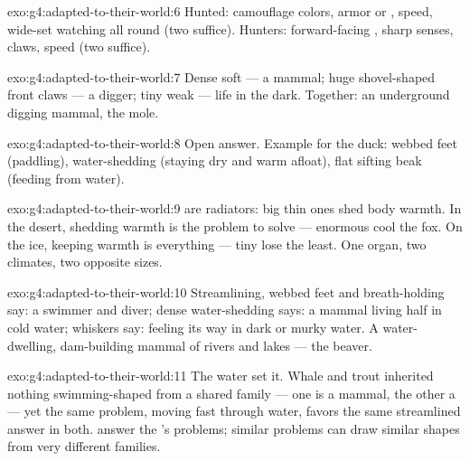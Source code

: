 \begin{solution}{exo:g4:adapted-to-their-world:6}
Hunted: camouflage colors, armor or , speed, wide-set
 watching all round (two suffice). Hunters: forward-facing
, sharp senses, claws, speed (two suffice).
\end{solution}

\begin{solution}{exo:g4:adapted-to-their-world:7}
Dense soft  --- a mammal; huge shovel-shaped front claws
--- a digger; tiny weak  --- life in the dark. Together:
an underground digging mammal, the mole.
\end{solution}

\begin{solution}{exo:g4:adapted-to-their-world:8}
Open answer. Example for the duck: webbed feet (paddling),
water-shedding  (staying dry and warm afloat), flat
sifting beak (feeding from water).
\end{solution}

\begin{solution}{exo:g4:adapted-to-their-world:9}
 are radiators: big thin ones shed body warmth. In the
desert, shedding warmth is the problem to solve --- enormous
 cool the fox. On the ice, keeping warmth is everything
--- tiny  lose the least. One organ, two climates, two
opposite sizes.
\end{solution}

\begin{solution}{exo:g4:adapted-to-their-world:10}
Streamlining, webbed feet and breath-holding say: a swimmer
and diver; dense water-shedding  says: a mammal living
half in cold water; whiskers say: feeling its way in dark or
murky water. A water-dwelling, dam-building mammal of rivers
and lakes --- the beaver.
\end{solution}

\begin{solution}{exo:g4:adapted-to-their-world:11}
The water set it. Whale and trout inherited nothing
swimming-shaped from a shared family --- one is a mammal, the
other a  --- yet the same problem, moving fast through
water, favors the same streamlined answer in both. 
answer the 's problems; similar problems can draw
similar shapes from very different families.
\end{solution}
